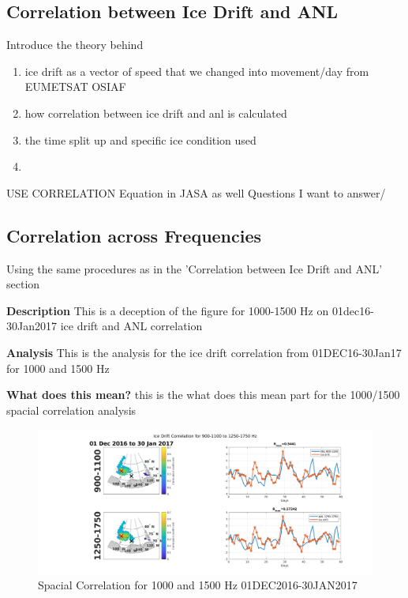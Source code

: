 \subsection{Correlation between Ice Drift and ANL}

Introduce the theory behind 
\begin{enumerate}
\item  ice drift as a vector of speed that we changed into movement/day from EUMETSAT OSIAF
\item  how correlation between ice drift and anl is calculated
\item  the time split up and specific ice condition used
\item 
\end{enumerate}


USE CORRELATION Equation in JASA as well
Questions I want to answer/
 

\subsection{Correlation across Frequencies}
Using the same procedures as in the 'Correlation between Ice Drift and ANL' section

\textbf{Description}
This is a deception of the figure for 1000-1500 Hz on 01dec16-30Jan2017 ice drift and ANL correlation

\textbf{Analysis}
This is the analysis for the ice drift correlation from 01DEC16-30Jan17 for 1000 and 1500 Hz

\textbf{What does this mean?}
this is the what does this mean part for the 1000/1500 spacial correlation analysis

\begin{figure}[h]
\centering
\includegraphics[scale=0.4]{Figures/1000_1500_spatial_corr_20161201-20170130.png}
\caption{Spacial Correlation for 1000 and 1500 Hz 01DEC2016-30JAN2017}
\label{fig_1000_1500corr}
\end{figure}

